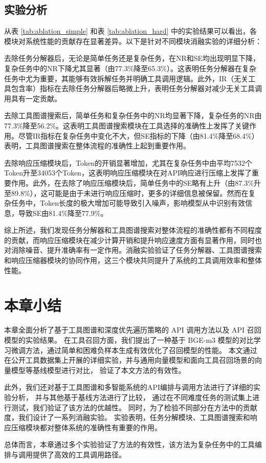 \subsection{实验分析}

从表 \ref{tab:ablation_simple} 和表 \ref{tab:ablation_hard} 中的实验结果可以看出，各模块对系统性能的贡献存在显著差异。以下是针对不同模块消融实验的详细分析：

去除任务分解器后，无论是简单任务还是复杂任务，在NR和SE均出现明显下降，复杂任务中的NR下降尤其显著（由77.3\%降至65.3\%）。这表明任务分解器在复杂任务中尤为重要，其能够有效拆解任务并明确工具调用逻辑。此外，IR（无关工具包含率）指标在去除任务分解器后略微上升，表明任务分解器对减少无关工具调用具有一定贡献。

去除工具图谱搜索后，简单任务和复杂任务中的NR均显著下降，复杂任务的NR由77.3\%降至56.2\%。这表明工具图谱搜索模块在工具选择的准确性上发挥了关键作用。尽管IR指标在复杂任务中变化不大，但SE指标的下降（由81.4\%降至68.4\%）表明，工具图谱搜索在整体流程的准确性上起到重要作用。

去除响应压缩模块后，Token的开销显著增加，尤其在复杂任务中由平均7532个Token升至34053个Token，这表明响应压缩模块在对API响应进行压缩上发挥了重要作用。此外，在去除了响应压缩模块后，简单任务中的SE略有上升（由87.3\%升至89.8\%），这可能是由于未进行响应压缩时，更多的详细信息被保留。然而在复杂任务中，Token长度的极大增加可能导致引入噪声，影响模型从中识别有效信息，导致SE由81.4\%降至77.9\%。

综上所述，我们发现任务分解器和工具图谱搜索对整体流程的准确性都有不同程度的贡献，而响应压缩模块在减少计算开销和提升响应速度方面有显著作用，同时也对消除噪音、提升准确率有一定作用。消融实验验证了任务分解器、工具图谱搜索和响应压缩器模块的协同作用，这三个模块共同提升了系统的工具调用效率和整体性能。

\section{本章小结}

本章全面分析了基于工具图谱和深度优先遍历策略的 API 调用方法以及 API 召回模型的实验结果。
在工具召回方面，我们提出了一种基于 BGE-m3 模型的对比学习微调方法，通过简单和困难负样本生成有效优化了召回模型的性能。
本文通过在公开工具数据集上开展的详细实验，并与通用向量模型和面向工具召回场景的向量模型等基线模型进行对比，
验证了本文方法的有效性。

此外，我们还对基于工具图谱和多智能系统的API编排与调用方法进行了详细的实验分析，
并与其他基于基线方法进行了比较，
通过在不同难度任务的测试集上进行测试，我们验证了该方法的优越性。
同时，为了检验不同部分在方法中的贡献度，我们设计了一系列消融实验。
实验表明，任务分解模块、工具图谱搜索和响应压缩模块都对整体系统的准确性有重要的作用。

总体而言，本章通过多个实验验证了方法的有效性，该方法为复杂任务中的工具编排与调用提供了高效的工具调用路径。